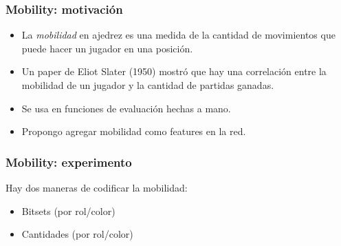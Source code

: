 \begin{frame}
\frametitle{Mobility: motivación}
\begin{itemize}
\item<1-> La \textit{mobilidad} en ajedrez es una medida de la cantidad de movimientos que puede hacer un jugador en una posición.
\item<2-> Un paper de Eliot Slater (1950) mostró que hay una correlación entre la mobilidad de un jugador y la cantidad de partidas ganadas.
\item<3-> Se usa en funciones de evaluación hechas a mano.
\item<4-> Propongo agregar mobilidad como features en la red.
\end{itemize}
\end{frame}

\begin{frame}
\frametitle{Mobility: experimento}
Hay dos maneras de codificar la mobilidad:
\begin{itemize}
\item Bitsets (por rol/color)
\item Cantidades (por rol/color)
\end{itemize}
\end{frame}

